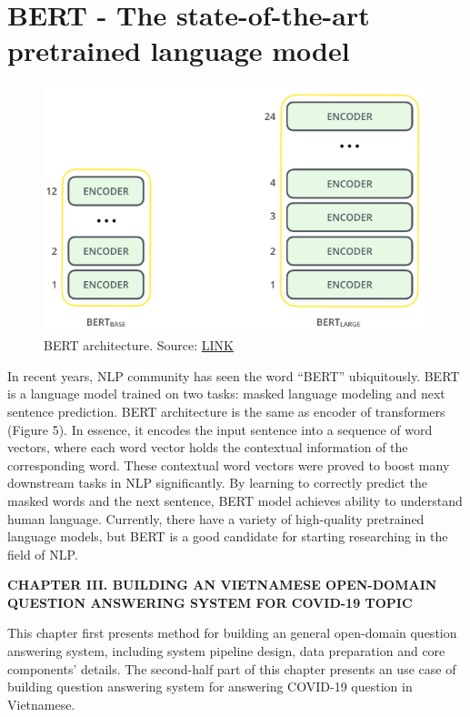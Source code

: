 \documentclass[3p, sort&compress, 12pt]{elsarticle}
\begin{document}
\section{BERT - The state-of-the-art pretrained language model}
\begin{figure}[!htbp]
	\centering
	\includegraphics[scale=.6]{images/bert.png}
	\caption{BERT architecture. Source: \href{http://jalammar.github.io/illustrated-bert/}{LINK}}
	\label{fig:2:05}
\end{figure}
\par In recent years, NLP community has seen the word “BERT” ubiquitously. BERT is a language model trained on two tasks: masked language modeling and next sentence prediction. BERT architecture is the same as encoder of transformers (Figure 5). In essence, it encodes the input sentence into a sequence of word vectors, where each word vector holds the contextual information of the corresponding word. These contextual word vectors were proved to boost many downstream tasks in NLP significantly. By learning to correctly predict the masked words and the next sentence, BERT model achieves ability to understand human language. Currently, there have a variety of high-quality pretrained language models, but BERT is a good candidate for starting researching in the field of NLP.
\newpage
\begin{spacing}{1.25}
\begin{center}
	\fontsize{20}{\baselineskip}\selectfont\sf\bfseries CHAPTER III. BUILDING AN VIETNAMESE OPEN-DOMAIN QUESTION ANSWERING SYSTEM FOR COVID-19 TOPIC
\end{center}
\end{spacing}
\label{chap:03}
\setcounter{section}{0}
This chapter first presents method for building an general open-domain question answering system, including system pipeline design, data preparation and core components' details. The second-half part of this chapter presents an use case of building question answering system for answering COVID-19 question in Vietnamese.
\end{document}
